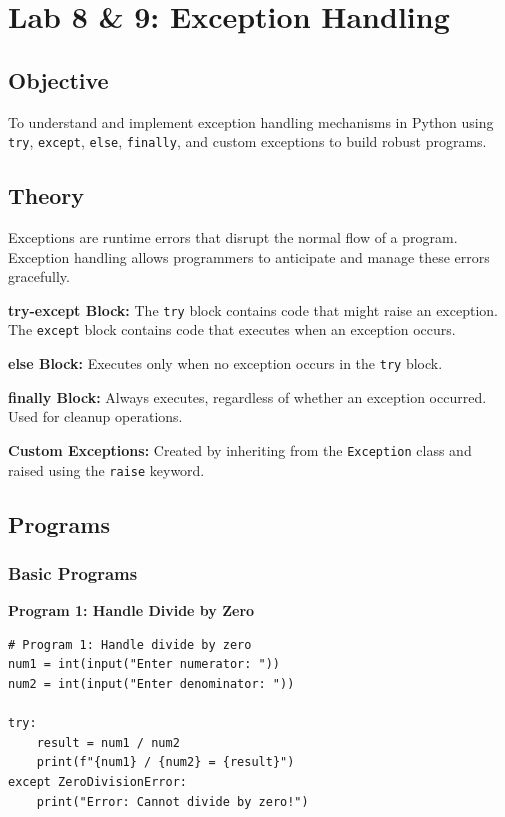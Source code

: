 \documentclass[12pt,a4paper]{article}
\begin{document}
\newpage

\section{Lab 8 \& 9: Exception Handling}

\subsection{Objective}
To understand and implement exception handling mechanisms in Python using \texttt{try}, \texttt{except}, \texttt{else}, \texttt{finally}, and custom exceptions to build robust programs.

\subsection{Theory}

Exceptions are runtime errors that disrupt the normal flow of a program. Exception handling allows programmers to anticipate and manage these errors gracefully.

\textbf{try-except Block:} The \texttt{try} block contains code that might raise an exception. The \texttt{except} block contains code that executes when an exception occurs.

\textbf{else Block:} Executes only when no exception occurs in the \texttt{try} block.

\textbf{finally Block:} Always executes, regardless of whether an exception occurred. Used for cleanup operations.

\textbf{Custom Exceptions:} Created by inheriting from the \texttt{Exception} class and raised using the \texttt{raise} keyword.

\subsection{Programs}
\subsubsection{Basic Programs}

\textbf{Program 1: Handle Divide by Zero}

\begin{lstlisting}
# Program 1: Handle divide by zero
num1 = int(input("Enter numerator: "))
num2 = int(input("Enter denominator: "))

try:
    result = num1 / num2
    print(f"{num1} / {num2} = {result}")
except ZeroDivisionError:
    print("Error: Cannot divide by zero!")
\end{lstlisting}
\end{document}
